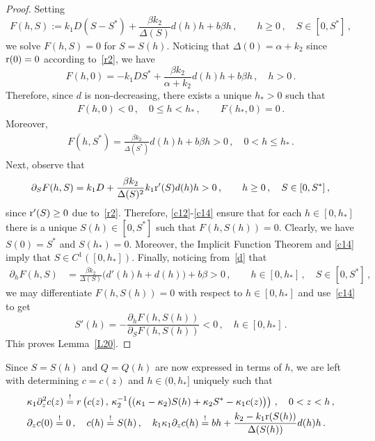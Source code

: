 \documentclass[reqno,11pt]{amsart}
\numberwithin{equation}{section}
\begin{document}
\begin{proof}
Setting
$$
F(h,S):=k_1D(S-S^*)+\frac{\beta k_2}{\Delta(S)} d(h)h+b\beta h\,,\qquad h\ge 0\,,\quad S\in [0,S^*]\,,
$$
we solve $F(h,S)=0$ for $S=S(h)$.
 Noticing that $\Delta(0)=\alpha+k_2$ since ${\rm r}(0)=0$ according to~\eqref{r2}, we have
$$
F(h,0)=-k_1D S^*+\frac{\beta k_2}{\alpha+k_2} d(h)h+b\beta h\,,\quad h>0\,.
$$
Therefore, since $d$ is non-decreasing, there exists a unique $h_*>0$ such that 
\begin{align}\label{c12}
F(h,0)<0\,,\quad 0\le h< h_*\,,\qquad F(h_*,0)=0\,.
\end{align} 
Moreover, 
\begin{align}\label{c13}
F(h,S^*)= \frac{\beta k_2}{\Delta(S^*)} d(h)h+b\beta h>0\,,\quad 0< h\le h_*\,.
\end{align}
Next, observe that
\begin{align}\label{c14}
\partial_SF(h,S)=k_1D+ \frac{\beta k_2}{\Delta(S)^2} k_1{\rm r}'(S)d(h)h>0\,,\qquad h\ge 0\,,\quad S\in [0,S^*]\,,
\end{align}
since ${\rm r}'(S)\ge 0$ due to~\eqref{r2}. Therefore, \eqref{c12}-\eqref{c14} ensure that for each $h\in [0,h_*]$ there is a unique $S(h)\in [0,S^*]$ such that $F(h,S(h))=0$. 
Clearly, we have $S(0)=S^*$ and $S(h_*)=0$. Moreover, the Implicit Function Theorem and \eqref{c14} imply that $S\in C^1([0,h_*])$. Finally, noticing from~\eqref{d} that
\begin{align*}
\partial_h F(h,S)&= \frac{\beta k_2}{\Delta(S)} \big(d'(h)h+d(h)\big)+b\beta >0\,,\qquad h\in [0,h_*]\,,\quad S\in [0,S^*]\,,
\end{align*}
we may differentiate $F(h,S(h))=0$ with respect to $h\in [0,h_*]$ and use~\eqref{c14} to get
$$
S'(h)=-\frac{\partial_h F(h,S(h))}{\partial_SF(h,S(h))}<0\,,\quad h\in [0,h_*]\,.
$$
This proves Lemma~\ref{L20}.
\end{proof}

Since $S=S(h)$ and  $Q=Q(h)$ are now expressed in terms of $h$, we are left with determining  $c=c(z)$ and $h\in (0,h_*]$ uniquely such that
\begin{subequations}\label{AA}
\begin{align}
&\kappa_1\partial_z^2 c(z)\stackrel{!}{=}r\left(c(z)\,,\,\kappa_2^{-1}\big((\kappa_1-\kappa_2)S(h)+\kappa_2 S^*-\kappa_1 c(z)\big)\right)\,, \quad 0<z<h\,, \label{A1q}\\
&\partial_z c(0)\stackrel{!}{=}0\,,\quad
 c(h)\stackrel{!}{=}S(h)\,,\quad
k_1\kappa_1 \partial_z c(h)\stackrel{!}{=}bh+\frac{k_2-k_1 {\rm r}(S(h))}{\Delta(S(h))}d(h)h\,. \label{AA4}
\end{align}
\end{subequations}
\end{document}

